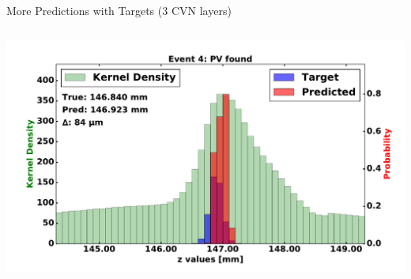 \begin{frame}{More Predictions with Targets (3 CVN layers)}
\begin{columns}[c]
\begin{center}
           \includegraphics[width=1\textwidth, height=0.45\textwidth, trim=18 0 18 0]{images/120000_3layer_27.pdf}
       \end{center}
  \end{columns}
\end{frame}

